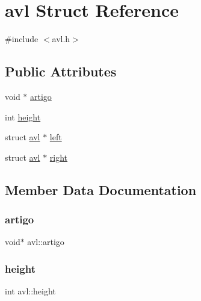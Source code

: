 \hypertarget{structavl}{}\section{avl Struct Reference}
\label{structavl}


{\ttfamily \#include $<$avl.\+h$>$}

\subsection*{Public Attributes}
\begin{DoxyCompactItemize}
\item 
void $\ast$ \hyperlink{structavl_a2234d65d627e91280fc8e60746595645}{artigo}
\item 
int \hyperlink{structavl_aefde0aaea0ba319fb4c3a306f24aea79}{height}
\item 
struct \hyperlink{structavl}{avl} $\ast$ \hyperlink{structavl_a8fdb211e22fe74c142d6be7d3663a592}{left}
\item 
struct \hyperlink{structavl}{avl} $\ast$ \hyperlink{structavl_afaccb3499fc54bb80a23e88c3316fd9d}{right}
\end{DoxyCompactItemize}


\subsection{Member Data Documentation}
\mbox{\label{structavl_a2234d65d627e91280fc8e60746595645}} 
\subsubsection{\texorpdfstring{artigo}{artigo}}
{\footnotesize\ttfamily void$\ast$ avl\+::artigo}

\mbox{\label{structavl_aefde0aaea0ba319fb4c3a306f24aea79}} 
\subsubsection{\texorpdfstring{height}{height}}
{\footnotesize\ttfamily int avl\+::height}

\mbox{\label{structavl_a8fdb211e22fe74c142d6be7d3663a592}} 
